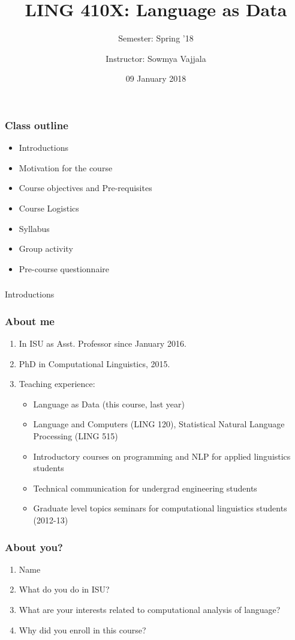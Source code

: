 \documentclass{beamer}
\author[Sowmya Vajjala]{Instructor: Sowmya Vajjala}
\title[LING 410X]{LING 410X: Language as Data}
\subtitle{Semester: Spring '18}
\date{09 January 2018}
\institute{Iowa State University, USA}
\begin{document}
\begin{frame}\titlepage
\end{frame}

\begin{frame}
\frametitle{Class outline}
\begin{itemize}
\item Introductions %
\item Motivation for the course %
\item Course objectives and Pre-requisites %
\item Course Logistics %
\item Syllabus %
\item Group activity %
\item Pre-course questionnaire %
\end{itemize}
\end{frame}

\begin{frame}
\frametitle{}
\begin{center}
\Large Introductions
\end{center}
\end{frame}

\begin{frame}
\frametitle{About me}
\begin{enumerate}
\item In ISU as Asst. Professor since January 2016.
\item PhD in Computational Linguistics, 2015.
\item Teaching experience:
\begin{itemize}
\item Language as Data (this course, last year)
\item Language and Computers (LING 120), Statistical Natural Language Processing (LING 515)
\item Introductory courses on programming and NLP for applied linguistics students
\item Technical communication for undergrad engineering students
\item Graduate level topics seminars for computational linguistics students (2012-13)
\end{itemize}
\end{enumerate}
\end{frame}

\begin{frame}
\frametitle{About you?}
\begin{enumerate}
\item Name
\item What do you do in ISU?
\item What are your interests related to computational analysis of language?
\item Why did you enroll in this course?
\end{enumerate}
\end{frame}
\end{document}
